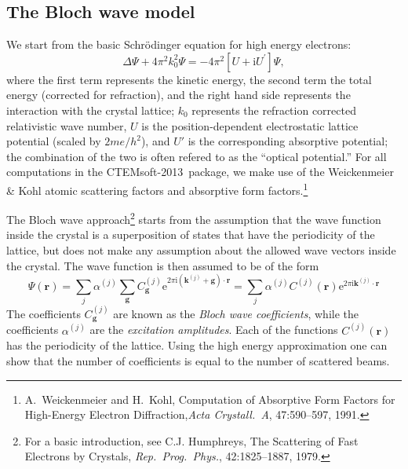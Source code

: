 \documentclass[DIV=calc, paper=letter, fontsize=11pt]{scrartcl}	 %
\newcommand{\ctp}{\textsf{CTEMsoft-2013}}
\newcommand{\Cgj}[2]{C_{\mathbf{#1}}^{(#2)}}
\begin{document}
\subsection{The Bloch wave model}
We start from the basic Schr{\"o}dinger equation for high energy electrons:
\begin{equation}
	\Delta\Psi+4\pi^2k_0^2\Psi=
	-4\pi^2\left[U+\mathrm{i}U^{\prime}\right]\Psi,
	\label{eq:start}
\end{equation}
where the first term represents the kinetic energy, the second term the total energy (corrected for 
refraction), and the right hand side represents the interaction with the crystal lattice; $k_0$ represents
the refraction corrected relativistic wave number, $U$ is the position-dependent electrostatic lattice 
potential (scaled by $2me/h^2$), and $U'$ is the corresponding absorptive potential; the combination of the 
two is often refered to as the ``optical potential.''  For all computations in the \ctp\ package, we make use 
of the Weickenmeier \& Kohl atomic scattering factors and absorptive form factors.\footnote{A.~Weickenmeier and H.~Kohl,
Computation of {A}bsorptive {F}orm {F}actors for {H}igh-{E}nergy {E}lectron {D}iffraction,{\em Acta Crystall.\ A}, 47:590--597, 1991.}

The Bloch wave approach\footnote{For a basic introduction, see C.J. Humphreys,
The {S}cattering of {F}ast {E}lectrons by {C}rystals, {\em Rep.\ Prog.\ Phys.}, 42:1825--1887, 1979.}
starts from the assumption that the wave function inside the crystal
is a superposition of states that have the periodicity of the lattice, but does not make any
assumption about the allowed wave vectors inside the crystal.  The wave function is then 
assumed to be of the form 
\begin{equation}
	\Psi(\mathbf{r})=\sum_j\alpha^{(j)}\sum_{\mathbf{g}}\Cgj{g}{j} 
	\mathrm{e}^{2\pi \mathrm{i}(\mathbf{k}^{(j)} +\mathbf{g})\cdot\mathbf{r}}=
        \sum_j\alpha^{(j)}C^{(j)}(\mathbf{r})\mathrm{e}^{2\pi \mathrm{i}
        \mathbf{k}^{(j)}\cdot\mathbf{r}}
	\label{eq:blochexpansion2}
\end{equation}
The coefficients
$\Cgj{g}{j}$ are known as the \textit{Bloch wave coefficients}, 
while the coefficients $\alpha^{(j)}$ are the \textit{excitation amplitudes}.
Each of the functions $C^{(j)}(\mathbf{r})$ has the periodicity of the lattice.
Using the high energy approximation one can show that the number of coefficients is
equal to the number of scattered beams.  
\end{document}
